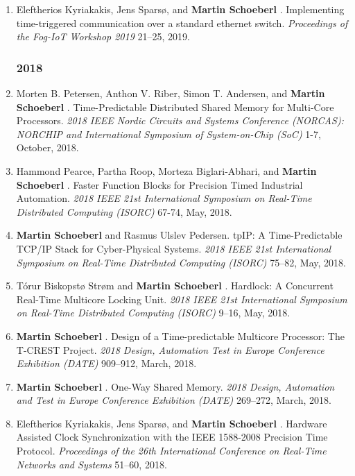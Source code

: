 \begin{enumerate}
\item Eleftherios Kyriakakis, Jens Spars{\o}, and {\bf Martin Schoeberl }.
 Implementing time-triggered communication over a standard ethernet switch.
 \emph{Proceedings of the Fog-IoT Workshop 2019} 21--25, 2019.


\subsubsection*{2018}

\item Morten B. Petersen, Anthon V. Riber, Simon T. Andersen, and {\bf Martin Schoeberl }.
 Time-Predictable Distributed Shared Memory for Multi-Core Processors.
 \emph{2018 IEEE Nordic Circuits and Systems Conference (NORCAS): NORCHIP and International Symposium of System-on-Chip (SoC)} 1-7, October, 2018.

\item Hammond Pearce, Partha Roop, Morteza Biglari-Abhari, and {\bf Martin Schoeberl }.
 Faster Function Blocks for Precision Timed Industrial Automation.
 \emph{2018 IEEE 21st International Symposium on Real-Time Distributed Computing (ISORC)} 67-74, May, 2018.

\item {\bf Martin Schoeberl } and Rasmus Ulslev Pedersen.
 tpIP: A Time-Predictable TCP/IP Stack for Cyber-Physical Systems.
 \emph{2018 IEEE 21st International Symposium on Real-Time Distributed Computing (ISORC)} 75--82, May, 2018.

\item T{\'o}rur Biskopst{\o} Str{\o}m and {\bf Martin Schoeberl }.
 Hardlock: A Concurrent Real-Time Multicore Locking Unit.
 \emph{2018 IEEE 21st International Symposium on Real-Time Distributed Computing (ISORC)} 9--16, May, 2018.

\item {\bf Martin Schoeberl }.
 Design of a Time-predictable Multicore Processor: The T-CREST Project.
 \emph{2018 Design, Automation Test in Europe Conference Exhibition (DATE)} 909--912, March, 2018.

\item {\bf Martin Schoeberl }.
 One-Way Shared Memory.
 \emph{2018 Design, Automation and Test in Europe Conference Exhibition (DATE)} 269--272, March, 2018.

\item Eleftherios Kyriakakis, Jens Spars{\o}, and {\bf Martin Schoeberl }.
 Hardware Assisted Clock Synchronization with the IEEE 1588-2008 Precision Time Protocol.
 \emph{Proceedings of the 26th International Conference on Real-Time Networks and Systems} 51--60, 2018.


\end{enumerate}

